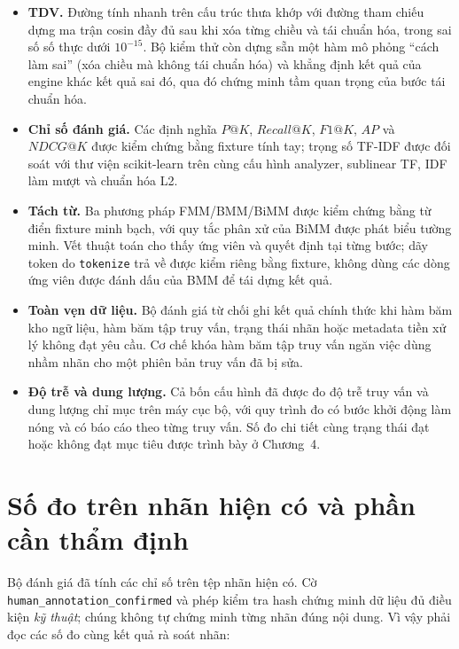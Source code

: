 \begin{itemize}
  \item \textbf{TDV.} Đường tính nhanh trên cấu trúc thưa khớp với đường tham
        chiếu dựng ma trận cosin đầy đủ sau khi xóa từng chiều và tái chuẩn hóa,
        trong sai số số thực dưới $10^{-15}$. Bộ kiểm thử còn dựng sẵn một hàm mô
        phỏng ``cách làm sai'' (xóa chiều mà không tái chuẩn hóa) và khẳng định kết
        quả của engine khác kết quả sai đó, qua đó chứng minh tầm quan trọng của
        bước tái chuẩn hóa.
  \item \textbf{Chỉ số đánh giá.} Các định nghĩa $P@K$, $Recall@K$, $F1@K$, $AP$ và
        $NDCG@K$ được kiểm chứng bằng fixture tính tay; trọng số TF-IDF được đối
        soát với thư viện scikit-learn \cite{sklearn_tfidf} trên cùng cấu hình
        analyzer, sublinear TF, IDF làm mượt và chuẩn hóa L2.
  \item \textbf{Tách từ.} Ba phương pháp FMM/BMM/BiMM được kiểm chứng bằng từ điển
        fixture minh bạch, với quy tắc phân xử của BiMM được phát biểu tường minh.
        Vết thuật toán cho thấy ứng viên và quyết định tại từng bước; dãy token do
        \texttt{tokenize} trả về được kiểm riêng bằng fixture, không dùng các dòng
        ứng viên được đánh dấu của BMM để tái dựng kết quả.
  \item \textbf{Toàn vẹn dữ liệu.} Bộ đánh giá từ chối ghi kết quả chính thức khi
        hàm băm kho ngữ liệu, hàm băm tập truy vấn, trạng thái nhãn hoặc metadata
        tiền xử lý không đạt yêu cầu. Cơ chế khóa hàm băm tập truy vấn ngăn việc
        dùng nhầm nhãn cho một phiên bản truy vấn đã bị sửa.
  \item \textbf{Độ trễ và dung lượng.} Cả bốn cấu hình đã được đo độ trễ truy vấn và
        dung lượng chỉ mục trên máy cục bộ, với quy trình đo có bước khởi động làm
        nóng và có báo cáo theo từng truy vấn. Số đo chi tiết cùng trạng thái đạt
        hoặc không đạt mục tiêu được trình bày ở Chương~4.
\end{itemize}

\section{Số đo trên nhãn hiện có và phần cần thẩm định}

Bộ đánh giá đã tính các chỉ số trên tệp nhãn hiện có. Cờ
\texttt{human\_annotation\_confirmed} và phép kiểm tra hash chứng minh dữ liệu
đủ điều kiện \emph{kỹ thuật}; chúng không tự chứng minh từng nhãn đúng nội dung.
Vì vậy phải đọc các số đo cùng kết quả rà soát nhãn:

